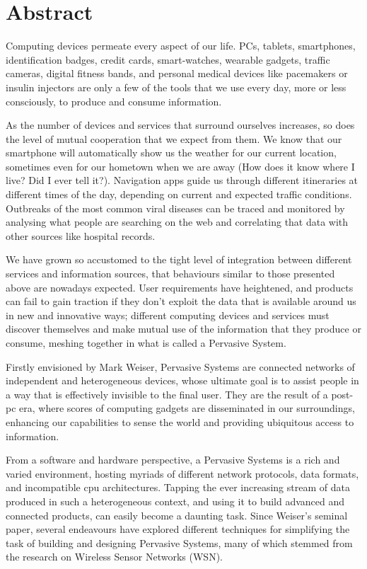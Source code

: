 \documentclass[a4paper,oneside]{report}
\begin{document}


\chapter*{Abstract}
Computing devices permeate every aspect of our life. PCs, tablets, smartphones, identification badges, credit cards, smart-watches, wearable gadgets, traffic cameras, digital fitness bands, and personal medical devices like pacemakers or insulin injectors are only a few of the tools that we use every day, more or less consciously, to produce and consume information.

As the number of devices and services that surround ourselves increases, so does the level of mutual cooperation that we expect from them. We know that our smartphone will automatically show us the weather for our current location, sometimes even for our hometown when we are away (How does it know where I live? Did I ever tell it?). Navigation apps guide us through different itineraries at different times of the day, depending on current and expected traffic conditions. Outbreaks of the most common viral diseases can be traced and monitored by analysing what people are searching on the web and correlating that data with other sources like hospital records.

We have grown so accustomed to the tight level of integration between different services and information sources, that behaviours similar to those presented above are nowadays expected. User requirements have heightened, and products can fail to gain traction if they don’t exploit the data that is available around us in new and innovative ways; different computing devices and services must discover themselves and make mutual use of the information that they produce or consume, meshing together in what is called a Pervasive System.

Firstly envisioned by Mark Weiser, Pervasive Systems are connected networks of independent and heterogeneous devices, whose ultimate goal is to assist people in a way that is effectively invisible to the final user. They are the result of a post-pc era, where scores of computing gadgets are disseminated in our surroundings, enhancing our capabilities to sense the world and providing ubiquitous access to information.

From a software and hardware perspective, a Pervasive Systems is a rich and varied environment, hosting myriads of different network protocols, data formats, and incompatible cpu architectures. Tapping the ever increasing stream of data produced in such a heterogeneous context, and using it to build advanced and connected products, can easily become a daunting task. Since Weiser’s seminal paper, several endeavours have explored different techniques for simplifying the task of building and designing Pervasive Systems, many of which stemmed from the research on Wireless Sensor Networks (WSN).
\end{document}
